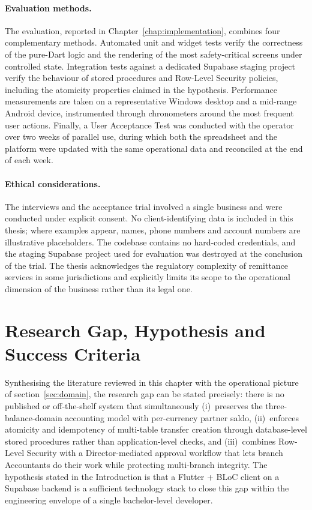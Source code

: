 \paragraph{Evaluation methods.}
The evaluation, reported in Chapter~\ref{chap:implementation}, combines four complementary methods. Automated unit and widget tests verify the correctness of the pure-Dart logic and the rendering of the most safety-critical screens under controlled state. Integration tests against a dedicated Supabase staging project verify the behaviour of stored procedures and Row-Level Security policies, including the atomicity properties claimed in the hypothesis. Performance measurements are taken on a representative Windows desktop and a mid-range Android device, instrumented through chronometers around the most frequent user actions. Finally, a User Acceptance Test was conducted with the operator over two weeks of parallel use, during which both the spreadsheet and the platform were updated with the same operational data and reconciled at the end of each week.

\paragraph{Ethical considerations.}
The interviews and the acceptance trial involved a single business and were conducted under explicit consent. No client-identifying data is included in this thesis; where examples appear, names, phone numbers and account numbers are illustrative placeholders. The codebase contains no hard-coded credentials, and the staging Supabase project used for evaluation was destroyed at the conclusion of the trial. The thesis acknowledges the regulatory complexity of remittance services in some jurisdictions and explicitly limits its scope to the operational dimension of the business rather than its legal one.

\section{Research Gap, Hypothesis and Success Criteria}
\label{sec:gap}

Synthesising the literature reviewed in this chapter with the operational picture of section~\ref{sec:domain}, the research gap can be stated precisely: there is no published or off-the-shelf system that simultaneously (i)~preserves the three-balance-domain accounting model with per-currency partner saldo, (ii)~enforces atomicity and idempotency of multi-table transfer creation through database-level stored procedures rather than application-level checks, and (iii)~combines Row-Level Security with a Director-mediated approval workflow that lets branch Accountants do their work while protecting multi-branch integrity. The hypothesis stated in the Introduction is that a Flutter + BLoC client on a Supabase backend is a sufficient technology stack to close this gap within the engineering envelope of a single bachelor-level developer.

